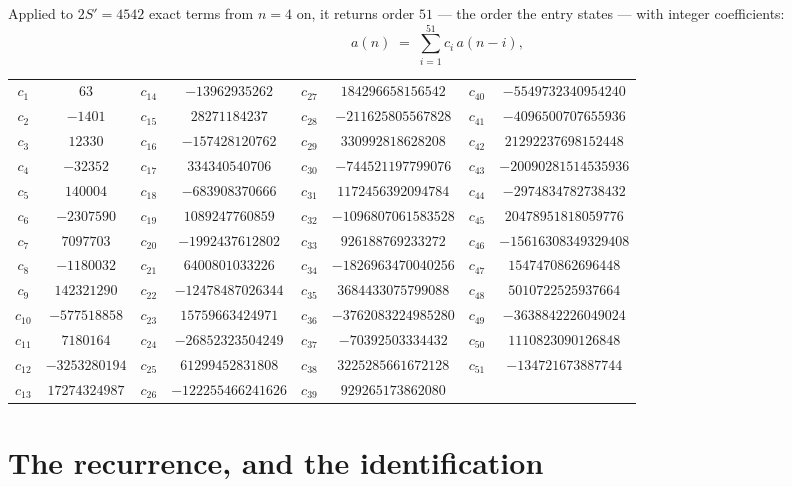 \documentclass[11pt,a4paper]{article}
\theoremstyle{plain}
\theoremstyle{definition}
\begin{document}
Applied to $2S'=4542$ exact terms from $n=4$ on, it returns order $51$ --- the
order the entry states --- with integer coefficients:
\[
a(n)\;=\;\sum_{i=1}^{51}c_i\,a(n-i),
\]
\begin{center}\small
\begin{tabular}{cccccccc}
$c_{1}$ & $63$ & $c_{14}$ & $-13962935262$ & $c_{27}$ & $184296658156542$ & $c_{40}$ & $-5549732340954240$ \\
$c_{2}$ & $-1401$ & $c_{15}$ & $28271184237$ & $c_{28}$ & $-211625805567828$ & $c_{41}$ & $-4096500707655936$ \\
$c_{3}$ & $12330$ & $c_{16}$ & $-157428120762$ & $c_{29}$ & $330992818628208$ & $c_{42}$ & $21292237698152448$ \\
$c_{4}$ & $-32352$ & $c_{17}$ & $334340540706$ & $c_{30}$ & $-744521197799076$ & $c_{43}$ & $-20090281514535936$ \\
$c_{5}$ & $140004$ & $c_{18}$ & $-683908370666$ & $c_{31}$ & $1172456392094784$ & $c_{44}$ & $-2974834782738432$ \\
$c_{6}$ & $-2307590$ & $c_{19}$ & $1089247760859$ & $c_{32}$ & $-1096807061583528$ & $c_{45}$ & $20478951818059776$ \\
$c_{7}$ & $7097703$ & $c_{20}$ & $-1992437612802$ & $c_{33}$ & $926188769233272$ & $c_{46}$ & $-15616308349329408$ \\
$c_{8}$ & $-1180032$ & $c_{21}$ & $6400801033226$ & $c_{34}$ & $-1826963470040256$ & $c_{47}$ & $1547470862696448$ \\
$c_{9}$ & $142321290$ & $c_{22}$ & $-12478487026344$ & $c_{35}$ & $3684433075799088$ & $c_{48}$ & $5010722525937664$ \\
$c_{10}$ & $-577518858$ & $c_{23}$ & $15759663424971$ & $c_{36}$ & $-3762083224985280$ & $c_{49}$ & $-3638842226049024$ \\
$c_{11}$ & $7180164$ & $c_{24}$ & $-26852323504249$ & $c_{37}$ & $-70392503334432$ & $c_{50}$ & $1110823090126848$ \\
$c_{12}$ & $-3253280194$ & $c_{25}$ & $61299452831808$ & $c_{38}$ & $3225285661672128$ & $c_{51}$ & $-134721673887744$ \\
$c_{13}$ & $17274324987$ & $c_{26}$ & $-122255466241626$ & $c_{39}$ & $929265173862080$ &  &  \\
\end{tabular}
\end{center}

\section{The recurrence, and the identification}
\end{document}
